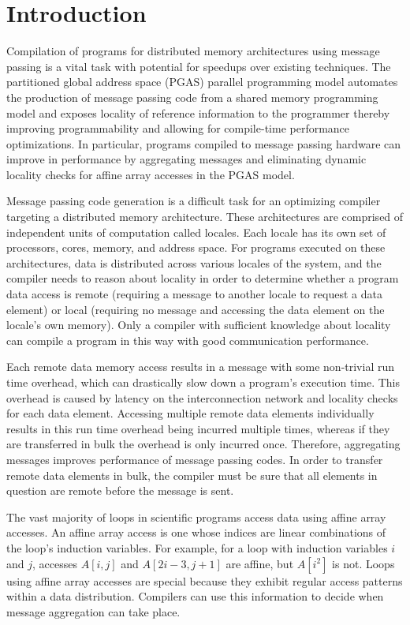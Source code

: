 \section{Introduction}\label{sec:intro} 

Compilation of programs for distributed memory architectures using message passing is a vital task with potential for speedups over existing techniques. The partitioned global address space (PGAS) parallel programming model automates the production of message passing code from a shared memory programming model and exposes locality of reference information to the programmer thereby improving programmability and allowing for compile-time performance optimizations. In particular, programs compiled to message passing hardware can improve in performance by aggregating messages and eliminating dynamic locality checks for affine array accesses in the PGAS model. 

Message passing code generation is a difficult task for an optimizing compiler targeting a distributed memory architecture. These architectures are comprised of independent units of computation called locales. Each locale has its own set of processors, cores, memory, and address space. For programs executed on these architectures, data is distributed across various locales of the system, and the compiler needs to reason about locality in order to determine whether a program data access is remote (requiring a message to another locale to request a data element) or local (requiring no message and accessing the data element on the locale's own memory). Only a compiler with sufficient knowledge about locality can compile a program in this way with good communication performance. 

Each remote data memory access results in a message with some non-trivial run time overhead, which can drastically slow down a program's execution time. This overhead is caused by latency on the interconnection network and locality checks for each data element. Accessing multiple remote data elements individually results in this run time overhead being incurred multiple times, whereas if they are transferred in bulk the overhead is only incurred once. Therefore, aggregating messages improves performance of message passing codes. In order to transfer remote data elements in bulk, the compiler must be sure that all elements in question are remote before the message is sent. 

The vast majority of loops in scientific programs access data using affine array accesses. An affine array access is one whose indices are linear combinations of the loop's induction variables. For example, for a loop with induction variables $i$ and $j$, accesses $A[i, j]$ and $A[2i-3, j+1]$ are affine, but $A[i^2]$ is not. Loops using affine array accesses are special because they exhibit regular access patterns within a data distribution. Compilers can use this information to decide when message aggregation can take place. 

